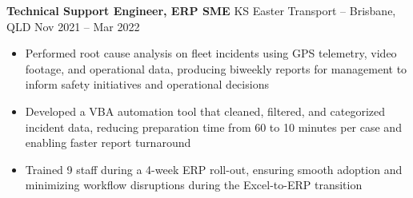 \documentclass[11pt]{article}       %
\begin{document}
\textbf{Technical Support Engineer, ERP SME} {KS Easter Transport} -- Brisbane, QLD \hfill Nov 2021 -- Mar 2022 \\
\vspace{-9pt}
\begin{itemize}

  \item Performed root cause analysis on fleet incidents using GPS telemetry, video footage, and operational data, producing biweekly reports for management to inform safety initiatives and operational decisions
  \item Developed a VBA automation tool that cleaned, filtered, and categorized incident data, reducing preparation time from 60 to 10 minutes per case and enabling faster report turnaround
  \item Trained 9 staff during a 4-week ERP roll-out, ensuring smooth adoption and minimizing workflow disruptions during the Excel-to-ERP transition
\end{itemize}

\end{document}
